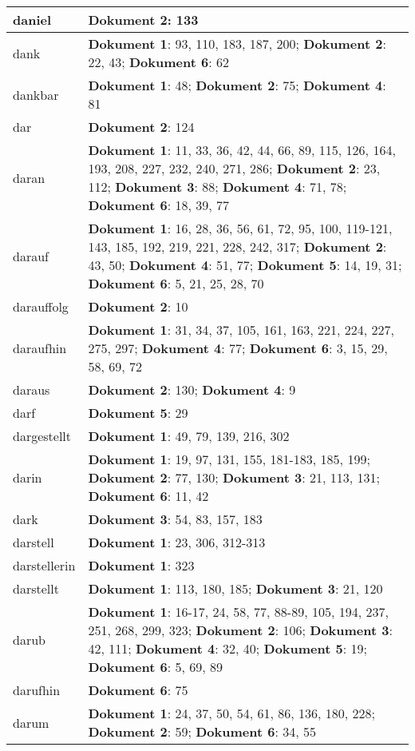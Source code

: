 \documentclass[a5paper]{article}
\begin{document}
\begin{longtable}[l]{|l|p{3in}|}
\hline
daniel & \textbf{Dokument 2}: 133 \\
\hline
dank & \textbf{Dokument 1}: 93, 110, 183, 187, 200; \textbf{Dokument 2}: 22, 43; \textbf{Dokument 6}: 62 \\
\hline
dankbar & \textbf{Dokument 1}: 48; \textbf{Dokument 2}: 75; \textbf{Dokument 4}: 81 \\
\hline
dar & \textbf{Dokument 2}: 124 \\
\hline
daran & \textbf{Dokument 1}: 11, 33, 36, 42, 44, 66, 89, 115, 126, 164, 193, 208, 227, 232, 240, 271, 286; \textbf{Dokument 2}: 23, 112; \textbf{Dokument 3}: 88; \textbf{Dokument 4}: 71, 78; \textbf{Dokument 6}: 18, 39, 77 \\
\hline
darauf & \textbf{Dokument 1}: 16, 28, 36, 56, 61, 72, 95, 100, 119-121, 143, 185, 192, 219, 221, 228, 242, 317; \textbf{Dokument 2}: 43, 50; \textbf{Dokument 4}: 51, 77; \textbf{Dokument 5}: 14, 19, 31; \textbf{Dokument 6}: 5, 21, 25, 28, 70 \\
\hline
darauffolg & \textbf{Dokument 2}: 10 \\
\hline
daraufhin & \textbf{Dokument 1}: 31, 34, 37, 105, 161, 163, 221, 224, 227, 275, 297; \textbf{Dokument 4}: 77; \textbf{Dokument 6}: 3, 15, 29, 58, 69, 72 \\
\hline
daraus & \textbf{Dokument 2}: 130; \textbf{Dokument 4}: 9 \\
\hline
darf & \textbf{Dokument 5}: 29 \\
\hline
dargestellt & \textbf{Dokument 1}: 49, 79, 139, 216, 302 \\
\hline
darin & \textbf{Dokument 1}: 19, 97, 131, 155, 181-183, 185, 199; \textbf{Dokument 2}: 77, 130; \textbf{Dokument 3}: 21, 113, 131; \textbf{Dokument 6}: 11, 42 \\
\hline
dark & \textbf{Dokument 3}: 54, 83, 157, 183 \\
\hline
darstell & \textbf{Dokument 1}: 23, 306, 312-313 \\
\hline
darstellerin & \textbf{Dokument 1}: 323 \\
\hline
darstellt & \textbf{Dokument 1}: 113, 180, 185; \textbf{Dokument 3}: 21, 120 \\
\hline
darub & \textbf{Dokument 1}: 16-17, 24, 58, 77, 88-89, 105, 194, 237, 251, 268, 299, 323; \textbf{Dokument 2}: 106; \textbf{Dokument 3}: 42, 111; \textbf{Dokument 4}: 32, 40; \textbf{Dokument 5}: 19; \textbf{Dokument 6}: 5, 69, 89 \\
\hline
darufhin & \textbf{Dokument 6}: 75 \\
\hline
darum & \textbf{Dokument 1}: 24, 37, 50, 54, 61, 86, 136, 180, 228; \textbf{Dokument 2}: 59; \textbf{Dokument 6}: 34, 55 \\

\end{longtable}
\end{document}
